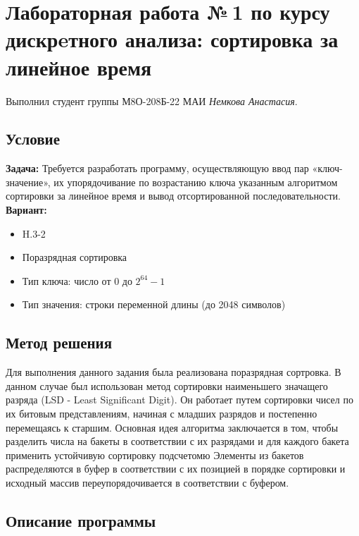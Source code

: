 \documentclass[12pt]{article}
\begin{document}
\section*{Лабораторная работа №\,1 по курсу дискрeтного анализа: сортировка за линейное время}

Выполнил студент группы М8О-208Б-22 МАИ \textit{Немкова Анастасия}.

\subsection*{Условие}

\textbf{Задача:}
Требуется разработать программу, осуществляющую ввод пар «ключ-значение», их упорядочивание по возрастанию ключа указанным алгоритмом сортировки за линейное время и вывод отсортированной последовательности.\newline
\newline
\textbf{Вариант:}
\begin{itemize}
    \item H.3-2
    \item Поразрядная сортировка
    \item Тип ключа: число от 0 до $2^{64} - 1$
    \item Тип значения: строки переменной длины (до 2048 символов)
\end{itemize}


\subsection*{Метод решения}

Для выполнения данного задания была реализована поразрядная сортровка. В данном случае был использован  метод сортировки наименьшего значащего разряда (LSD - Least Significant Digit). Он работает путем сортировки чисел по их битовым представлениям, начиная с младших разрядов и постепенно перемещаясь к старшим.
Основная идея алгоритма заключается в том, чтобы разделить числа на бакеты в соответствии с их разрядами и для каждого бакета применить устойчивую сортировку подсчетомю Элементы из бакетов распределяются в буфер в соответствии с их позицией в порядке сортировки и исходный массив переупорядочивается в соответствии с буфером.

\subsection*{Описание программы}
\end{document}
